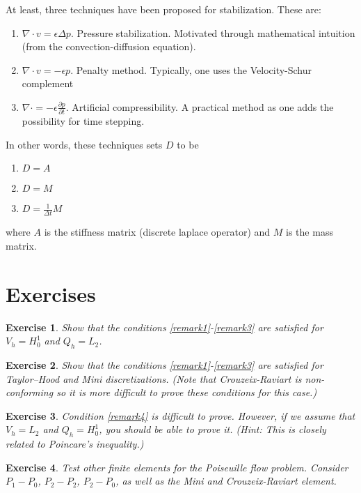 \documentclass[a4paper,11pt]{amsart}
\newtheorem{exercise}{Exercise}[section]
\begin{document}
At least, three techniques have been proposed for stabilization. These are:
\begin{enumerate}
\item $\nabla\cdot v = \epsilon\Delta p$. Pressure stabilization. Motivated through mathematical intuition (from the convection-diffusion equation).
\item $\nabla\cdot v = -\epsilon p$. Penalty method. Typically, one uses the Velocity-Schur complement
\item $\nabla\cdot = -\epsilon\frac{\partial p}{\partial
  t}$. Artificial compressibility. A practical method as one adds the
  possibility for time stepping.
\end{enumerate}

\noindent
In other words, these techniques sets $D$ to be
\begin{enumerate}
	\item $D=A$
	\item $D=M$
	\item $D=\frac{1}{\Delta t}M$
\end{enumerate}
where $A$ is the stiffness matrix (discrete laplace operator) and $M$ is the mass matrix.


\section{Exercises}

\begin{exercise}
Show that the conditions \eqref{remark1}-\eqref{remark3} are satisfied for
$V_h = H^1_0$ and $Q_h=L_2$.
\end{exercise}
\begin{exercise}
Show that the conditions \eqref{remark1}-\eqref{remark3} are satisfied for
Taylor--Hood and Mini discretizations.
(Note that Crouzeix-Raviart is non-conforming so it is more difficult to prove these conditions
for this case.)
\end{exercise}
\begin{exercise}
Condition \eqref{remark4} is difficult to prove. However, if we assume that
$V_h = L_2$ and $Q_h=H^1_0$, you should be able to prove it. (Hint: This
is closely related to Poincare's inequality.)
\end{exercise}

\begin{exercise}
Test other finite elements for the Poiseuille flow problem. Consider $P_1-P_0$, $P_2-P_2$, $P_2-P_0$, as
well as the Mini and Crouzeix-Raviart element.
\end{exercise}
\end{document}
